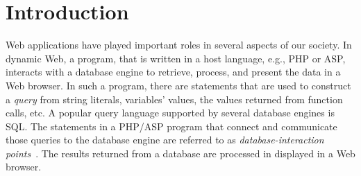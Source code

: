 \section{Introduction}

Web applications have played important roles in several aspects of our
society. In dynamic Web, a program, that is written in a host
language, e.g., PHP or ASP, interacts with a database engine to
retrieve, process, and present the data in a Web browser. In such a
program, there are statements that are used to construct a {\em query}
from string literals, variables' values, the values returned from
function calls, etc. A popular query language supported by several
database engines is SQL. The statements in a PHP/ASP program that
connect and communicate those queries to the database engine are
referred to as {\em database-interaction points}~\cite{ga-ase11}. The
results returned from a database are processed in displayed in a Web
browser.




